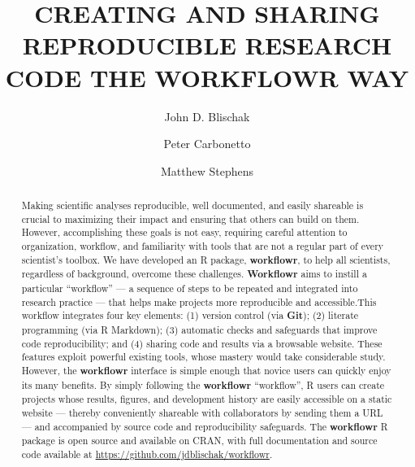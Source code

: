 \documentclass[9pt,a4paper]{extarticle}
\begin{document}
\pagestyle{front}

\title{CREATING AND SHARING REPRODUCIBLE RESEARCH CODE THE WORKFLOWR
WAY}

\author[1]{John D. Blischak}

\author[1,2]{Peter Carbonetto}

\author[1,3]{Matthew Stephens}




\maketitle

\thispagestyle{front}

\begin{abstract}


Making scientific analyses reproducible, well documented, and easily
shareable is crucial to maximizing their impact and ensuring that others
can build on them. However, accomplishing these goals is not easy,
requiring careful attention to organization, workflow, and familiarity
with tools that are not a regular part of every scientist's toolbox. We
have developed an R package, \textbf{workflowr}, to help all scientists,
regardless of background, overcome these challenges. \textbf{Workflowr} aims to
instill a particular ``workflow'' --- a sequence of steps to be repeated
and integrated into research practice --- that helps make projects more
reproducible and accessible.This workflow integrates four key elements:
(1) version control (via \textbf{Git}); (2) literate programming (via R
Markdown); (3) automatic checks and safeguards that improve code
reproducibility; and (4) sharing code and results via a browsable
website. These features exploit powerful existing tools, whose mastery
would take considerable study. However, the \textbf{workflowr} interface is
simple enough that novice users can quickly enjoy its many benefits. By
simply following the \textbf{workflowr} ``workflow'', R users can create projects
whose results, figures, and development history are easily accessible on
a static website --- thereby conveniently shareable with collaborators
by sending them a URL --- and accompanied by source code and
reproducibility safeguards. The \textbf{workflowr} R package is open source and
available on CRAN, with full documentation and source code available at
\url{https://github.com/jdblischak/workflowr}.

\end{abstract}
\end{document}
